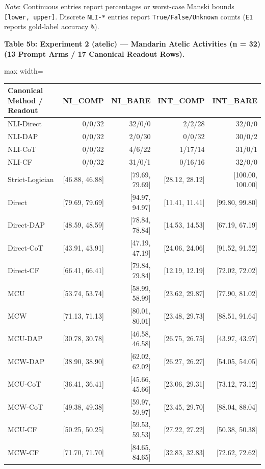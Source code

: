 \documentclass[11pt,a4paper]{article}
\begin{document}
\textit{Note}: Continuous entries report percentages or worst-case Manski bounds \texttt{[lower, upper]}. Discrete \texttt{NLI-\allowbreak{}*} entries report \texttt{True/\allowbreak{}False/\allowbreak{}Unknown} counts (\texttt{E1} reports gold-label accuracy \texttt{\%}).

\textbf{Table 5b: Experiment 2 (atelic) --- Mandarin Atelic Activities (n = 32) (13 Prompt Arms / 17 Canonical Readout Rows).}

\begin{center}\begingroup\small\setlength{\tabcolsep}{4.5pt}\renewcommand{\arraystretch}{1.12}\begin{adjustbox}{max width=\textwidth}\begin{tabular}{lrrrr}\toprule
\textbf{Canonical Method / Readout} & \textbf{NI\_\allowbreak{}COMP} & \textbf{NI\_\allowbreak{}BARE} & \textbf{INT\_\allowbreak{}COMP} & \textbf{INT\_\allowbreak{}BARE} \\ \midrule
NLI-Direct & 0/0/32 & 32/0/0 & 2/2/28 & 32/0/0 \\
NLI-DAP & 0/0/32 & 2/0/30 & 0/0/32 & 30/0/2 \\
NLI-CoT & 0/0/32 & 4/6/22 & 1/17/14 & 31/0/1 \\
NLI-CF & 0/0/32 & 31/0/1 & 0/16/16 & 32/0/0 \\
Strict-Logician & [46.88, 46.88] & [79.69, 79.69] & [28.12, 28.12] & [100.00, 100.00] \\
Direct & [79.69, 79.69] & [94.97, 94.97] & [11.41, 11.41] & [99.80, 99.80] \\
Direct-DAP & [48.59, 48.59] & [78.84, 78.84] & [14.53, 14.53] & [67.19, 67.19] \\
Direct-CoT & [43.91, 43.91] & [47.19, 47.19] & [24.06, 24.06] & [91.52, 91.52] \\
Direct-CF & [66.41, 66.41] & [79.84, 79.84] & [12.19, 12.19] & [72.02, 72.02] \\
MCU & [53.74, 53.74] & [58.99, 58.99] & [23.62, 29.87] & [77.90, 81.02] \\
MCW & [71.13, 71.13] & [80.01, 80.01] & [23.48, 29.73] & [88.51, 91.64] \\
MCU-DAP & [30.78, 30.78] & [46.58, 46.58] & [26.75, 26.75] & [43.97, 43.97] \\
MCW-DAP & [38.90, 38.90] & [62.02, 62.02] & [26.27, 26.27] & [54.05, 54.05] \\
MCU-CoT & [36.41, 36.41] & [45.66, 45.66] & [23.06, 29.31] & [73.12, 73.12] \\
MCW-CoT & [49.38, 49.38] & [59.97, 59.97] & [23.45, 29.70] & [88.04, 88.04] \\
MCU-CF & [50.25, 50.25] & [59.53, 59.53] & [27.22, 27.22] & [50.38, 50.38] \\
MCW-CF & [71.70, 71.70] & [84.65, 84.65] & [32.83, 32.83] & [72.62, 72.62] \\
\bottomrule\end{tabular}\end{adjustbox}\endgroup\end{center}
\end{document}
